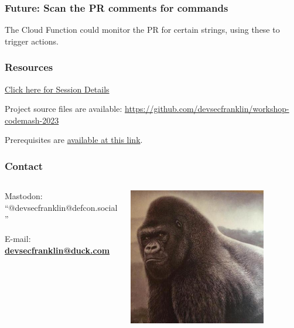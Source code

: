 \documentclass[aspectratio=169]{beamer}
\begin{document}
\begin{frame}
	\frametitle{Future: Scan the PR comments for commands}

	The Cloud Function could monitor the PR for certain strings, using these to trigger actions.

\end{frame}

\begin{frame}
	\frametitle{Resources}
	\href{https://www.codemash.org/session-details/?id=375030}{Click here for Session Details}
	\vspace{2mm}

	Project source files are available: \url{https://github.com/devsecfranklin/workshop-codemash-2023}
	\vspace{2mm}

	Prerequisites are \href{https://prereqs.codemash.org/}{available at this link}.
\end{frame}

\begin{frame}
	\frametitle{Contact}
	\begin{columns}
		\begin{column}{0.5\textwidth}
			Mastodon: ``@devsecfranklin@defcon.social''
			\vspace{2mm}

			E-mail: \textbf{\href{mailto:devsecfranklin@duck.com}{devsecfranklin@duck.com}}
		\end{column}
		\begin{column}{0.5\textwidth}
			\begin{center}
				\includegraphics[width=0.785\textwidth]{../images/rilla.jpg}
			\end{center}
		\end{column}
	\end{columns}
\end{frame}
\end{document}
